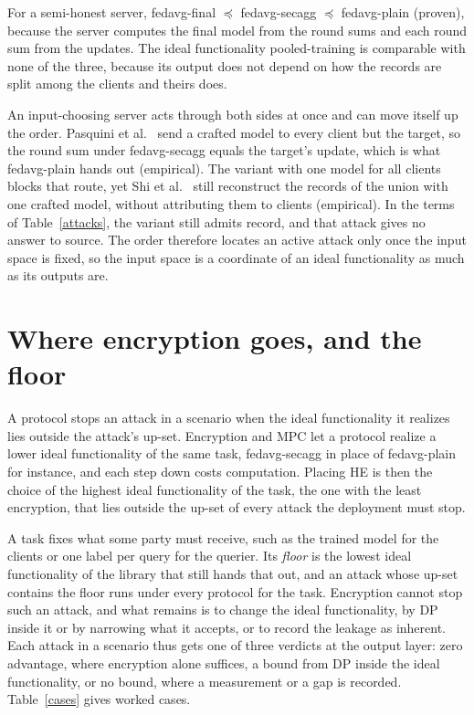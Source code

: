 \documentclass{labreport}
\begin{document}
For a semi-honest server, fedavg-final $\preceq$ fedavg-secagg $\preceq$ fedavg-plain (proven), because the server computes the final model from the round sums and each round sum from the updates.
The ideal functionality pooled-training is comparable with none of the three, because its output does not depend on how the records are split among the clients and theirs does.

An input-choosing server acts through both sides at once and can move itself up the order.
Pasquini et al.~\cite{PFA22} send a crafted model to every client but the target, so the round sum under fedavg-secagg equals the target's update, which is what fedavg-plain hands out (empirical).
The variant with one model for all clients blocks that route, yet Shi et al.~\cite{SWXZSHL25} still reconstruct the records of the union with one crafted model, without attributing them to clients (empirical).
In the terms of Table~\ref{attacks}, the variant still admits record, and that attack gives no answer to source.
The order therefore locates an active attack only once the input space is fixed, so the input space is a coordinate of an ideal functionality as much as its outputs are.

\section{Where encryption goes, and the floor}

A protocol stops an attack in a scenario when the ideal functionality it realizes lies outside the attack's up-set.
Encryption and MPC let a protocol realize a lower ideal functionality of the same task, fedavg-secagg in place of fedavg-plain for instance, and each step down costs computation.
Placing HE is then the choice of the highest ideal functionality of the task, the one with the least encryption, that lies outside the up-set of every attack the deployment must stop.

A task fixes what some party must receive, such as the trained model for the clients or one label per query for the querier.
Its \emph{floor} is the lowest ideal functionality of the library that still hands that out, and an attack whose up-set contains the floor runs under every protocol for the task.
Encryption cannot stop such an attack, and what remains is to change the ideal functionality, by DP inside it or by narrowing what it accepts, or to record the leakage as inherent.
Each attack in a scenario thus gets one of three verdicts at the output layer: zero advantage, where encryption alone suffices, a bound from DP inside the ideal functionality, or no bound, where a measurement or a gap is recorded.
Table~\ref{cases} gives worked cases.
\end{document}
